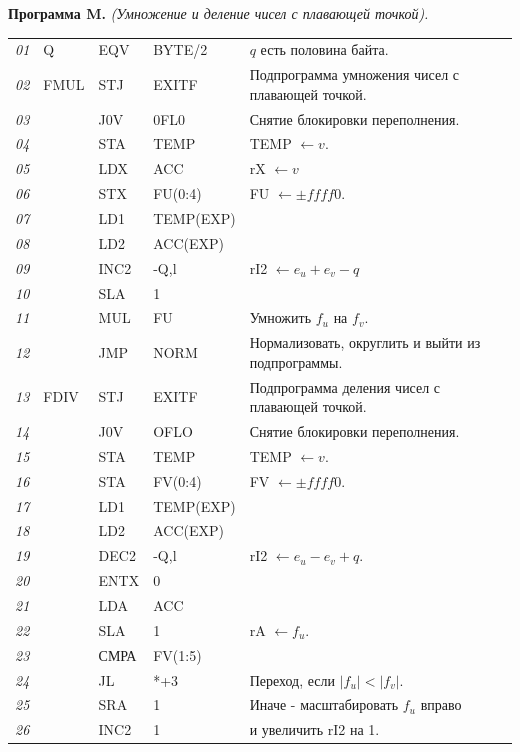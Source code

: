 \textbf{Программа M.} \textit{(Умножение и деление чисел с плавающей точкой).}
\begin{longtable}{l l l l l}
\textit{01} & Q & EQV & BYTE/2 & $q$ есть половина байта.\\
\textit{02} & FMUL & STJ & EXITF & Подпрограмма умножения чисел с плавающей точкой.\\
\textit{03} &  & J0V & 0FL0 & Снятие блокировки переполнения.\\
\textit{04} &  & STA & TEMP & TEMP $\leftarrow v$.\\
\textit{05} &  & LDX & ACC & rX $\leftarrow v$\\
\textit{06} &  & STX & FU(0:4) & FU $\leftarrow \pm f f f f 0$.\\
\textit{07} &  & LD1 & TEMP(EXP) &\\
\textit{08} &  & LD2 & ACC(EXP) &\\
\textit{09} &  & INC2 & -Q,l & rI2 $\leftarrow e_u + e_v - q$\\
\textit{10} &  & SLA & 1 &\\
\textit{11} &  & MUL & FU & Умножить $f_u$ на $f_v$.\\
\textit{12} &  & JMP & NORM & Нормализовать, округлить и выйти из подпрограммы.\\
\textit{13} & FDIV & STJ & EXITF & Подпрограмма деления чисел с плавающей точкой.\\
\textit{14} &  & J0V & OFLO & Снятие блокировки переполнения.\\
\textit{15} &  & STA & TEMP & TEMP $\leftarrow v$.\\
\textit{16} &  & STA & FV(0:4) & FV $\leftarrow \pm f f f f 0 $.\\
\textit{17} &  & LD1 & TEMP(EXP) &\\
\textit{18} &  & LD2 & ACC(EXP) &\\
\textit{19} &  & DEC2 & -Q,l & rI2 $\leftarrow e_u - e_v + q$.\\
\textit{20} &  & ENTX & 0 &\\
\textit{21} &  & LDA & ACC &\\
\textit{22} &  & SLA & 1 & rA $\leftarrow f_u$.\\
\textit{23} &  & СМРА & FV(1:5) &\\
\textit{24} &  & JL & *+3 & Переход, если $|f_u| < |f_v|$.\\
\textit{25} &  & SRA & 1 & Иначе - масштабировать $f_u$ вправо\\
\textit{26} &  & INC2 & 1 & и увеличить rI2 на 1.
\end{longtable}

